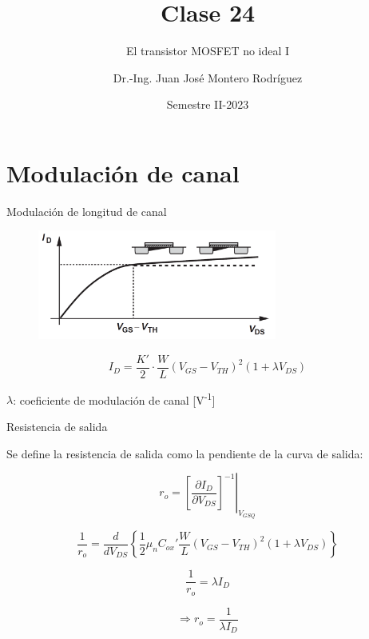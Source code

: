 \documentclass[t,10pt,aspectratio=169]{beamer}
\title{Clase 24}
\subtitle{El transistor MOSFET no ideal I}
\author{Dr.-Ing. Juan José Montero Rodríguez}
\institute{Escuela de Ingeniería Electrónica}
\date{Semestre II-2023}
\begin{document}
\begin{frame}{}
\maketitle
\end{frame}


\section{Modulación de canal}
\begin{frame}{Modulación de longitud de canal}

\begin{figure}[H]
    \centering
    \includegraphics[width=0.7\textwidth]{figuras/modulacion_largo_canal_1.png}
\end{figure}

	\begin{tcolorbox}
		\[ I_D = \dfrac{K'}{2}\cdot\dfrac{W}{L} (V_{GS}-V_{TH})^2(1+\lambda V_{DS}) \]
	\end{tcolorbox}
	$\lambda$: coeficiente de modulación de canal [V\textsuperscript{-1}]
    
\end{frame}


\begin{frame}{Resistencia de salida}

Se define la resistencia de salida como la pendiente de la curva de salida:

\[ r_o = \left.\left[\dfrac{\partial I_{D}}{\partial V_{DS}}\right]^{-1}\right|_{V_{GSQ}} \]

\[ \dfrac{1}{r_o} = \dfrac{d}{dV_{DS}} \left\{ \dfrac{1}{2} \mu_n C_{ox}' \dfrac{W}{L} \left( V_{GS} - V_{TH} \right)^2 \left( 1 + \lambda V_{DS} \right) \right\} \]

\[ \dfrac{1}{r_o} = \lambda I_D \]

\[ \Rightarrow r_o = \dfrac{1}{\lambda I_D} \]

\end{frame}
\end{document}

